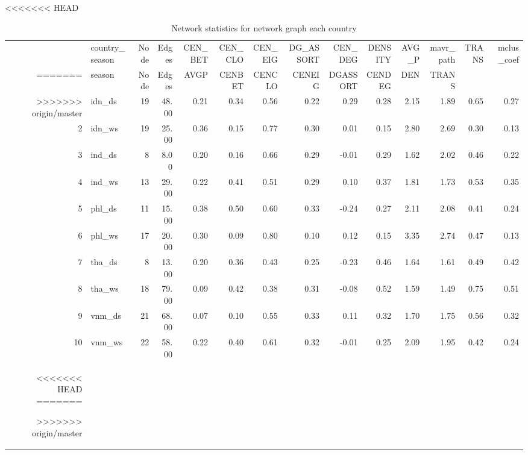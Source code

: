 <<<<<<< HEAD
\begin{landscape}
\begin{table}
\small
\centering
\begin{tabular}{rlrrrrrrrrrrrr}
  \hline
 & country\_season & Node & Edges & CEN\_BET & CEN\_CLO & CEN\_EIG & DG\_ASSORT & CEN\_DEG & DENSITY & AVG\_P & mavr\_path & TRANS & mclus\_coef \\ 
=======

\begin{table}
\centering
\begin{tabular}{rrrrrrrrrrrr}
  \hline
  country & season & Node & Edges & AVGP & CENBET & CENCLO & CENEIG & DGASSORT & CENDEG & DEN & TRANS \\ 
>>>>>>> origin/master
  \hline
1 & idn\_ds &  19 & 48.00 & 0.21 & 0.34 & 0.56 & 0.22 & 0.29 & 0.28 & 2.15 & 1.89 & 0.65 & 0.27 \\ 
  2 & idn\_ws &  19 & 25.00 & 0.36 & 0.15 & 0.77 & 0.30 & 0.01 & 0.15 & 2.80 & 2.69 & 0.30 & 0.13 \\ 
  3 & ind\_ds &   8 & 8.00 & 0.20 & 0.16 & 0.66 & 0.29 & -0.01 & 0.29 & 1.62 & 2.02 & 0.46 & 0.22 \\ 
  4 & ind\_ws &  13 & 29.00 & 0.22 & 0.41 & 0.51 & 0.29 & 0.10 & 0.37 & 1.81 & 1.73 & 0.53 & 0.35 \\ 
  5 & phl\_ds &  11 & 15.00 & 0.38 & 0.50 & 0.60 & 0.33 & -0.24 & 0.27 & 2.11 & 2.08 & 0.41 & 0.24 \\ 
  6 & phl\_ws &  17 & 20.00 & 0.30 & 0.09 & 0.80 & 0.10 & 0.12 & 0.15 & 3.35 & 2.74 & 0.47 & 0.13 \\ 
  7 & tha\_ds &   8 & 13.00 & 0.20 & 0.36 & 0.43 & 0.25 & -0.23 & 0.46 & 1.64 & 1.61 & 0.49 & 0.42 \\ 
  8 & tha\_ws &  18 & 79.00 & 0.09 & 0.42 & 0.38 & 0.31 & -0.08 & 0.52 & 1.59 & 1.49 & 0.75 & 0.51 \\ 
  9 & vnm\_ds &  21 & 68.00 & 0.07 & 0.10 & 0.55 & 0.33 & 0.11 & 0.32 & 1.70 & 1.75 & 0.56 & 0.32 \\ 
  10 & vnm\_ws &  22 & 58.00 & 0.22 & 0.40 & 0.61 & 0.32 & -0.01 & 0.25 & 2.09 & 1.95 & 0.42 & 0.24 \\ 
   \hline
<<<<<<< HEAD
=======
     \caption{Network statistics for network graph each country}
\label{table:Network_stat}
>>>>>>> origin/master
\end{tabular}
   \caption{Network statistics for network graph each country}
\label{table:Network_stat}
\end{table}
\end{landscape}
